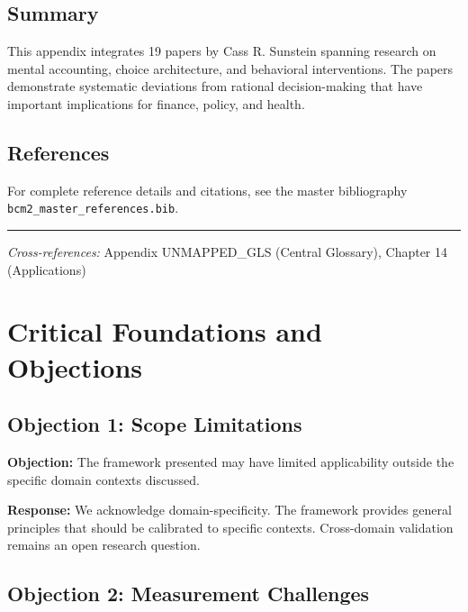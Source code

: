 \subsection{Summary}

This appendix integrates 19 papers by Cass R. Sunstein
spanning research on mental accounting, choice architecture, and behavioral
interventions. The papers demonstrate systematic deviations from rational
decision-making that have important implications for finance, policy, and health.

\subsection{References}

For complete reference details and citations, see the master bibliography
\texttt{bcm2\_master\_references.bib}.

\vspace{1em}
\hrule
\vspace{0.5em}

\noindent\textit{Cross-references:}
Appendix UNMAPPED_GLS (Central Glossary), Chapter 14 (Applications)



\section{Critical Foundations and Objections}
\label{sec:sun-foundations}

\subsection{Objection 1: Scope Limitations}

\textbf{Objection:} The framework presented may have limited applicability
outside the specific domain contexts discussed.

\textbf{Response:} We acknowledge domain-specificity. The framework provides
general principles that should be calibrated to specific contexts. Cross-domain
validation remains an open research question.

\subsection{Objection 2: Measurement Challenges}

